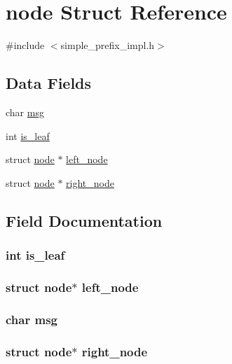 \hypertarget{structnode}{\section{node Struct Reference}
\label{structnode}
}


{\ttfamily \#include $<$simple\-\_\-prefix\-\_\-impl.\-h$>$}

\subsection*{Data Fields}
\begin{DoxyCompactItemize}
\item 
char \hyperlink{structnode_ad80e777cd260fdd5ca6ad3f25b5e76de}{msg}
\item 
int \hyperlink{structnode_ad066657fe1374fb9852c285175a3774f}{is\-\_\-leaf}
\item 
struct \hyperlink{structnode}{node} $\ast$ \hyperlink{structnode_a43dd3cf499d5b2270fcfbb29eb0a0d66}{left\-\_\-node}
\item 
struct \hyperlink{structnode}{node} $\ast$ \hyperlink{structnode_af729d9e66cefdd8c0a114cb0da5f7b7c}{right\-\_\-node}
\end{DoxyCompactItemize}


\subsection{Field Documentation}
\hypertarget{structnode_ad066657fe1374fb9852c285175a3774f}{
\subsubsection[{is\-\_\-leaf}]{\setlength{\rightskip}{0pt plus 5cm}int is\-\_\-leaf}}\label{structnode_ad066657fe1374fb9852c285175a3774f}
\hypertarget{structnode_a43dd3cf499d5b2270fcfbb29eb0a0d66}{
\subsubsection[{left\-\_\-node}]{\setlength{\rightskip}{0pt plus 5cm}struct {\bf node}$\ast$ left\-\_\-node}}\label{structnode_a43dd3cf499d5b2270fcfbb29eb0a0d66}
\hypertarget{structnode_ad80e777cd260fdd5ca6ad3f25b5e76de}{
\subsubsection[{msg}]{\setlength{\rightskip}{0pt plus 5cm}char msg}}\label{structnode_ad80e777cd260fdd5ca6ad3f25b5e76de}
\hypertarget{structnode_af729d9e66cefdd8c0a114cb0da5f7b7c}{
\subsubsection[{right\-\_\-node}]{\setlength{\rightskip}{0pt plus 5cm}struct {\bf node}$\ast$ right\-\_\-node}}\label{structnode_af729d9e66cefdd8c0a114cb0da5f7b7c}


